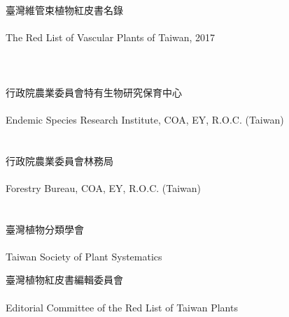 \thispagestyle{empty}
\vspace{1cm}
{\fontsize{56pt}{60pt}\selectfont
{} \\}
\hfill \\
{%
\fontsize{24pt}{26pt}\selectfont
臺灣維管束植物紅皮書名錄 \\ 
\hfill \\
The Red List of Vascular Plants of Taiwan, 2017}
\hfill \\
\hfill \\
\hfill \\
\hfill \\
{\fontsize{18pt}{20pt}\selectfont
行政院農業委員會特有生物研究保育中心 \\
\hfill \\
Endemic Species Research Institute, COA, EY, R.O.C. (Taiwan) \\
\hfill \\
\hfill \\
行政院農業委員會林務局 \\
\hfill \\
Forestry Bureau, COA, EY, R.O.C. (Taiwan) \\ 
\hfill \\
\hfill \\
臺灣植物分類學會 \\ 
\hfill \\
Taiwan Society of Plant Systematics}
\hfill \\
\par
\vfill
{\fontsize{16pt}{20pt}\selectfont
\noindent 臺灣植物紅皮書編輯委員會\\  } 
\hfill \\
{\fontsize{16pt}{20pt}\selectfont
Editorial Committee of the Red List of Taiwan Plants} 
\newpage
\thispagestyle{empty}
\mbox{}
